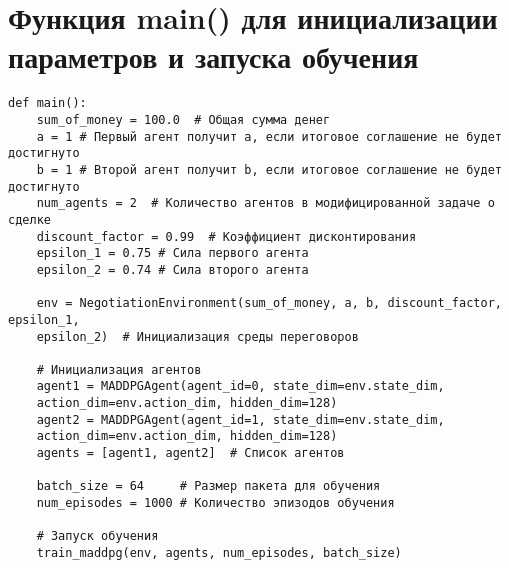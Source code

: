 \section{Функция main() для инициализации параметров и запуска обучения}

\begin{verbatim}
def main():
    sum_of_money = 100.0  # Общая сумма денег
    a = 1 # Первый агент получит a, если итоговое соглашение не будет достигнуто
    b = 1 # Второй агент получит b, если итоговое соглашение не будет достигнуто
    num_agents = 2  # Количество агентов в модифицированной задаче о сделке
    discount_factor = 0.99  # Коэффициент дисконтирования
    epsilon_1 = 0.75 # Сила первого агента
    epsilon_2 = 0.74 # Сила второго агента
    
    env = NegotiationEnvironment(sum_of_money, a, b, discount_factor, epsilon_1,
    epsilon_2)  # Инициализация среды переговоров
    
    # Инициализация агентов
    agent1 = MADDPGAgent(agent_id=0, state_dim=env.state_dim,
    action_dim=env.action_dim, hidden_dim=128)
    agent2 = MADDPGAgent(agent_id=1, state_dim=env.state_dim,
    action_dim=env.action_dim, hidden_dim=128)
    agents = [agent1, agent2]  # Список агентов
    
    batch_size = 64     # Размер пакета для обучения
    num_episodes = 1000 # Количество эпизодов обучения

    # Запуск обучения
    train_maddpg(env, agents, num_episodes, batch_size)
\end{verbatim}